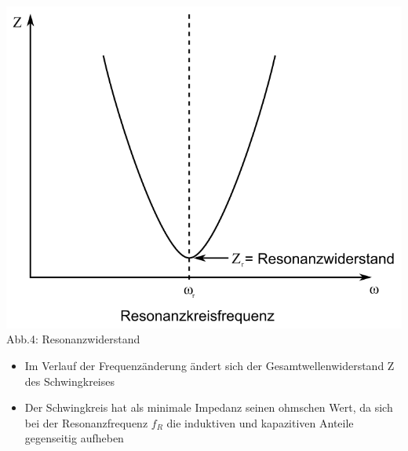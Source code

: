 \begin{frame}
\begin{center}
\begin{minipage}{0.4\textwidth}
      \includegraphics[height=.5\textheight,width=\textwidth,keepaspectratio]{a04/SerirenschwSig.png}\\
      \tiny{Abb.4: Resonanzwiderstand \cite{wmen}}
    \end{minipage}
  \end{center}
  \begin{itemize}
    \item Im Verlauf der Frequenzänderung ändert sich der Gesamtwellenwiderstand Z des Schwingkreises
    \item Der Schwingkreis hat als minimale Impedanz seinen ohmschen Wert, da sich bei der Resonanzfrequenz $f_R$ die induktiven und kapazitiven Anteile gegenseitig aufheben
  \end{itemize}
\end{frame}

